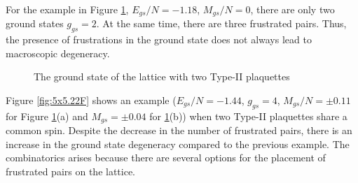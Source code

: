 \documentclass[preprint,12pt]{elsarticle}
\begin{document}
For the example in Figure \ref{fig:4x7}, $E_{gs}/N=-1.18$, $M_{gs}/N=0$, there are only two ground states $g_{gs}=2$. At the same time, there are three frustrated pairs. Thus, the presence of frustrations in the ground state does not always lead to macroscopic degeneracy. 

\begin{figure}[H]
	\centering
	\caption{The ground state of the lattice with two Type-II plaquettes}
	\label{fig:4x7}
\end{figure}

Figure \ref{fig:5x5.22F} shows an example ($E_{gs}/N=-1.44$, $g_{gs}=4$, $M_{gs}/N=\pm 0.11$ for Figure \ref{fig:4x7}(a) and $M_{gs}=\pm 0.04$ for \ref{fig:4x7}(b)) when two Type-II plaquettes share a common spin. Despite the decrease in the number of frustrated pairs, there is an increase in the ground state degeneracy compared to the previous example. The combinatorics arises because there are several options for the placement of frustrated pairs on the lattice.
\end{document}
